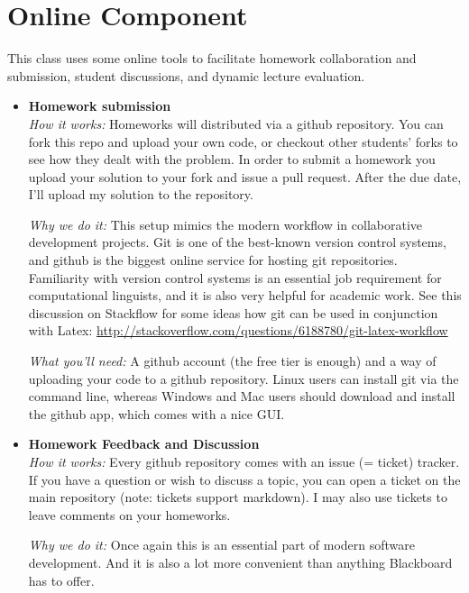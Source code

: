 \section{Online Component}

This class uses some online tools to facilitate homework collaboration and submission, student discussions, and dynamic lecture evaluation.

\begin{itemize}
    \item \textbf{Homework submission}\\
        \emph{How it works:}
        Homeworks will distributed via a github repository. 
        You can fork this repo and upload your own code, or checkout other students' forks to see how they dealt with the problem.
        In order to submit a homework you upload your solution to your fork and issue a pull request.
        After the due date, I'll upload my solution to the repository.

        \emph{Why we do it:}
        This setup mimics the modern workflow in collaborative development projects.
        Git is one of the best-known version control systems, and github is the biggest online service for hosting git repositories.
        Familiarity with version control systems is an essential job requirement for computational linguists, and it is also very helpful for academic work.
        See this discussion on Stackflow for some ideas how git can be used in conjunction with Latex:
        \href{http://stackoverflow.com/questions/6188780/git-latex-workflow}{http://stackoverflow.com/questions/6188780/git-latex-workflow}

        \emph{What you'll need:}
        A github account (the free tier is enough) and a way of uploading your code to a github repository. Linux users can install git via the command line, whereas Windows and Mac users should download and install the github app, which comes with a nice GUI.

    \item \textbf{Homework Feedback and Discussion}\\
        \emph{How it works:}
        Every github repository comes with an issue (= ticket) tracker.
        If you have a question or wish to discuss a topic, you can open a ticket on the main repository (note: tickets support markdown).
        I may also use tickets to leave comments on your homeworks.

        \emph{Why we do it:}
        Once again this is an essential part of modern software development.
        And it is also a lot more convenient than anything Blackboard has to offer.


\end{itemize}
